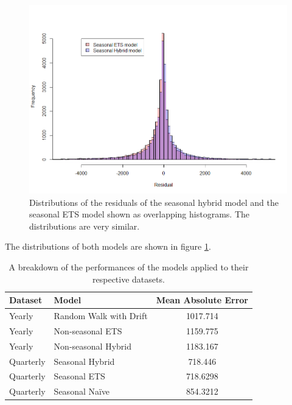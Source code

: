\documentclass[a4paper,12pt]{article}
\theoremstyle{definition}
\begin{document}
\begin{figure}[ht]
	\centering
	\includegraphics[width=\textwidth]{figures/seasonal_res_vs_seasonal_ets.png}
	\caption{Distributions of the residuals of the seasonal hybrid model and the seasonal ETS model shown as overlapping histograms. The distributions are very similar.}
	\label{fig:seasonal_res_vs_seasonal_ets}
\end{figure}

The distributions of both models are shown in figure \ref{fig:seasonal_res_vs_seasonal_ets}.

\begin{table}\label{tab:performance_summary}
  \centering
  \begin{tabular}{| l | l | c |}
    \hline
    \textbf{Dataset} & \textbf{Model} & \textbf{Mean Absolute Error} \\ \hline
    Yearly & Random Walk with Drift & 1017.714 \\ \hline
    Yearly & Non-seasonal ETS & 1159.775 \\ \hline
    Yearly & Non-seasonal Hybrid & 1183.167 \\ \hline    
    Quarterly & Seasonal Hybrid & 718.446 \\ \hline
    Quarterly & Seasonal ETS & 718.6298 \\ \hline
    Quarterly & Seasonal Na{\"i}ve & 854.3212 \\ \hline
  \end{tabular}
  \caption{A breakdown of the performances of the models applied to their respective datasets.}
  \label{tab:performance_summary}
\end{table}
\end{document}
